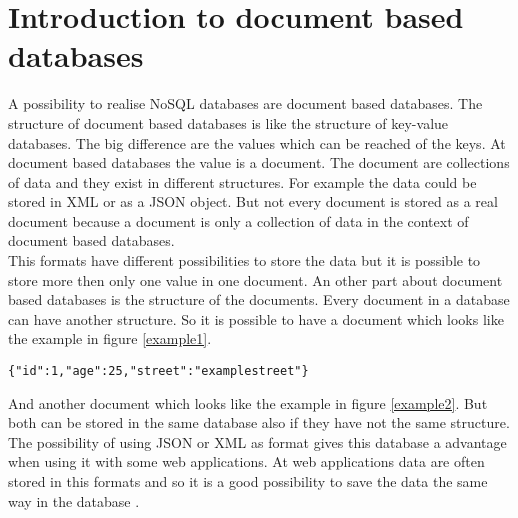\chapter{Introduction to document based databases}
A possibility to realise NoSQL databases are document based databases. The structure of document based databases is like the structure of key-value databases. The big difference are the values which can be reached of the keys. At document based databases the value is a document. The document are collections of data and they exist in different structures. For example the data could be stored in XML or as a JSON object. But not every document is stored as a real document because a document is only a collection of data in the context of document based databases. \\
This formats have different possibilities to store the data but it is possible to store more then only one value in one document. An other part about document based databases is the structure of the documents. Every document in a database can have another structure. 
So it is possible to have a document which looks like the example in figure \ref{example1}.

\begin{lstlisting}[frame=single, caption=Example]
%\begin{mylisting}{\label{example1} Example of an document}
{"id":1,"age":25,"street":"examplestreet"}
\end{lstlisting}
And another document which looks like the example in figure \ref{example2}. 
%
But both can be stored in the same database also if they have not the same structure. 
The possibility of using JSON or XML as format gives this database a advantage when using it with some web applications. At web applications data are often stored in this formats and so it is a good possibility to save the data the same way in the database \cite{DocDBIntro1,DocDBIntro2,DocDBIntro3}.
